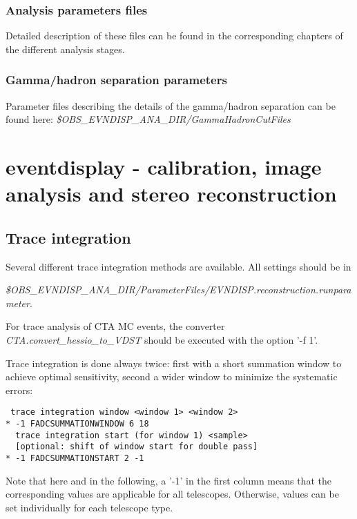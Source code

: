 \documentclass[titlepage,a4paper,twoside,11pt]{report}
\begin{document}
\subsection{Analysis parameters files}

Detailed description of these files can be found in the corresponding chapters of the different analysis stages.

\subsection{Gamma/hadron separation parameters}

Parameter files describing the details of the gamma/hadron separation can be found here:  {\it \$OBS\_EVNDISP\_ANA\_DIR/GammaHadronCutFiles}

%
%

\chapter{eventdisplay - calibration, image analysis and stereo reconstruction}

\section{Trace integration}

Several different trace integration methods are available. All settings should be in 

{\it \$OBS\_EVNDISP\_ANA\_DIR/ParameterFiles/EVNDISP.reconstruction.runparameter}.

For trace analysis of CTA MC events, the converter {\it CTA.convert\_hessio\_to\_VDST} should be executed with the option '-f 1'.

Trace integration is done always twice: first with a short summation window to achieve optimal sensitivity, second a wider window to minimize the systematic errors:

\begin{lstlisting}
 trace integration window <window 1> <window 2>
* -1 FADCSUMMATIONWINDOW 6 18
  trace integration start (for window 1) <sample> 
  [optional: shift of window start for double pass]
* -1 FADCSUMMATIONSTART 2 -1
\end{lstlisting}

Note that here and in the following, a '-1' in the first column means that the corresponding values are applicable for all telescopes. Otherwise, values can be set individually for each telescope type.
  
\end{document}
